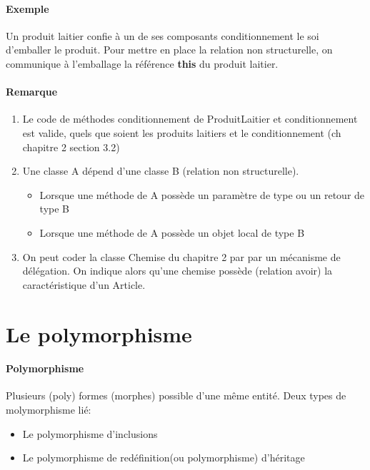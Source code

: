 \paragraph{Exemple} Un produit laitier confie à un de ses composants conditionnement le soi d'emballer le produit.
Pour mettre en place la relation non structurelle, on communique à l'emballage la référence \textbf{this} du produit laitier.
\begin{center}

	
\end{center}

\paragraph{Remarque}
\begin{enumerate}
	\item Le code de méthodes conditionnement de ProduitLaitier et conditionnement est valide, quels que soient les
		produits laitiers et le conditionnement (ch chapitre 2 section 3.2)
	\item Une classe A dépend d'une classe B (relation non structurelle).
		\begin{itemize}
			\item Lorsque une méthode de A possède un paramètre de type ou un retour de type B
			\item Lorsque une méthode de A possède un objet local de type B
		\end{itemize}
	\item On peut coder la classe Chemise du chapitre 2 par par un mécanisme de délégation. On indique
		alors qu'une chemise possède (relation avoir) la caractéristique d'un Article.

\end{enumerate}


\section{Le polymorphisme}
\paragraph{Polymorphisme} Plusieurs (poly) formes (morphes) possible d'une même entité.
Deux types de molymorphisme lié:
\begin{itemize}
	\item Le polymorphisme d'inclusions
	\item Le polymorphisme de redéfinition(ou polymorphisme) d'héritage
\end{itemize}

